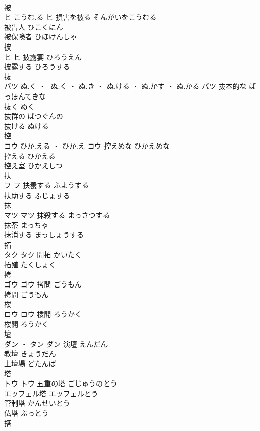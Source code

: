 \documentclass[8pt]{extreport}
\begin{document}
\begin{CJK}{UTF8}{min}
\\	被	
\\	ヒ	こうむ.る	ヒ	損害を被る	そんがいをこうむる	
\\	被告人	ひこくにん	
\\	被保険者	ひほけんしゃ	
\\	披	
\\	ヒ		ヒ	披露宴	ひろうえん	
\\	披露する	ひろうする	
\\	抜	
\\	バツ	ぬ.く ・ -ぬ.く ・ ぬ.き ・ ぬ.ける ・ ぬ.かす ・ ぬ.かる	バツ	抜本的な	ばっぽんてきな	
\\	抜く	ぬく	
\\	抜群の	ばつぐんの	
\\	抜ける	ぬける	
\\	控	
\\	コウ	ひか.える ・ ひか.え	コウ	控えめな	ひかえめな	
\\	控える	ひかえる	
\\	控え室	ひかえしつ	
\\	扶	
\\	フ		フ	扶養する	ふようする	
\\	扶助する	ふじょする	
\\	抹	
\\	マツ		マツ	抹殺する	まっさつする	
\\	抹茶	まっちゃ	
\\	抹消する	まっしょうする	
\\	拓	
\\	タク		タク	開拓	かいたく	
\\	拓殖	たくしょく	
\\	拷	
\\	ゴウ		ゴウ	拷問	ごうもん	
\\	拷問	ごうもん	
\\	楼	
\\	ロウ		ロウ	楼閣	ろうかく	
\\	楼閣	ろうかく	
\\	壇	
\\	ダン ・ タン		ダン	演壇	えんだん	
\\	教壇	きょうだん	
\\	土壇場	どたんば	
\\	塔	
\\	トウ		トウ	五重の塔	ごじゅうのとう	
\\	エッフェル塔	エッフェルとう	
\\	管制塔	かんせいとう	
\\	仏塔	ぶっとう	
\\	搭	

\end{CJK}
\end{document}
